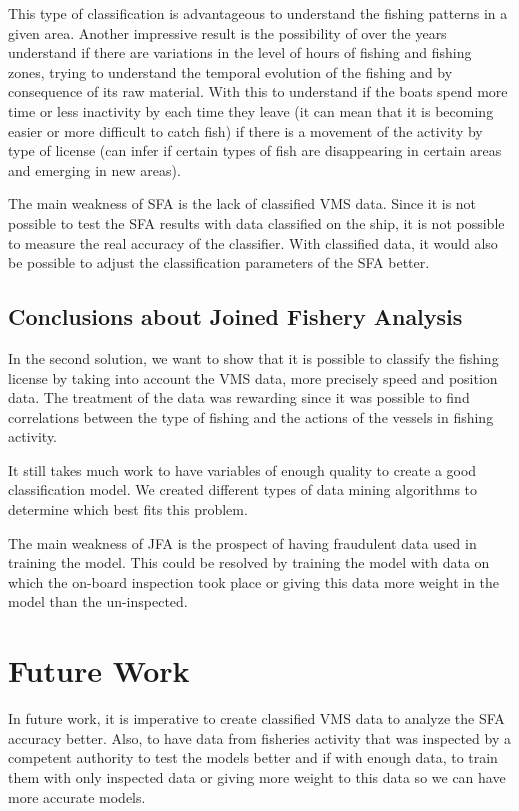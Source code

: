 This type of classification is advantageous to understand the fishing patterns in a given area. Another impressive result is the possibility of over the years understand if there are variations in the level of hours of fishing and fishing zones, trying to understand the temporal evolution of the fishing and by consequence of its raw material. With this to understand if the boats spend more time or less inactivity by each time they leave (it can mean that it is becoming easier or more difficult to catch fish) if there is a movement of the activity by type of license (can infer if certain types of fish are disappearing in certain areas and emerging in new areas).


The main weakness of SFA is the lack of classified VMS data. Since it is not possible to test the SFA results with data classified on the ship, it is not possible to measure the real accuracy of the classifier. With classified data, it would also be possible to adjust the classification parameters of the SFA better.


\subsection{Conclusions about Joined Fishery Analysis} %
\label{sub:con_jfa}
In the second solution, we want to show that it is possible to classify the fishing license by taking into account the VMS data, more precisely speed and position data.
The treatment of the data was rewarding since it was possible to find correlations between the type of fishing and the actions of the vessels in fishing activity.

It still takes much work to have variables of enough quality to create a good classification model.
We created different types of data mining algorithms to determine which best fits this problem.

The main weakness of JFA is the prospect of having fraudulent data used in training the model. This could be resolved by training the model with data on which the on-board inspection took place or giving this data more weight in the model than the un-inspected.



\section{Future Work} %
\label{sub:future_work}

In future work, it is imperative to create classified VMS data to analyze the SFA accuracy better. Also, to have data from fisheries activity that was inspected by a competent authority to test the models better and if with enough data, to train them with only inspected data or giving more weight to this data so we can have more accurate models.
 







